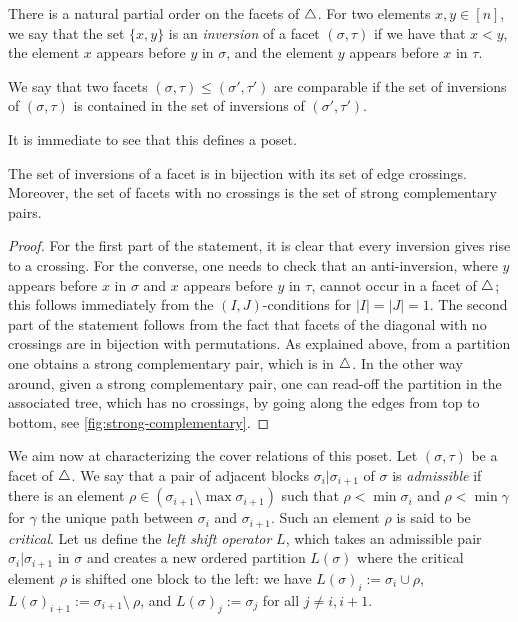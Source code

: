 There is a natural partial order on the facets of $\triangle$. 
For two elements $x,y \in [n]$, we say that the set $\{x,y\}$ is an \emph{inversion} of a facet $(\sigma,\tau)$ if we have that $x<y$, the element $x$ appears before $y$ in $\sigma$, and the element $y$ appears before $x$ in $\tau$. 

\begin{definition}
    We say that two facets $(\sigma,\tau) \leq (\sigma',\tau')$ are comparable if the set of inversions of $(\sigma,\tau)$ is contained in the set of inversions of $(\sigma',\tau')$.
\end{definition}

It is immediate to see that this defines a poset.

\begin{proposition}
\label{p:crossings}
The set of inversions of a facet is in bijection with its set of edge crossings. 
Moreover, the set of facets with no crossings is the set of strong complementary pairs. 
\end{proposition}

\begin{proof}
    For the first part of the statement, it is clear that every inversion gives rise to a crossing. 
    For the converse, one needs to check that an anti-inversion, where $y$ appears before $x$ in $\sigma$ and $x$ appears before $y$ in $\tau$, cannot occur in a facet of $\triangle$; this follows immediately from the $(I,J)$-conditions for $|I|=|J|=1$. 
    The second part of the statement follows from the fact that facets of the diagonal with no crossings are in bijection with permutations.
    As explained above, from a partition one obtains a strong complementary pair, which is in $\triangle$. 
    In the other way around, given a strong complementary pair, one can read-off the partition in the associated tree, which has no crossings, by going along the edges from top to bottom, see \cref{fig:strong-complementary}.
\end{proof}


We aim now at characterizing the cover relations of this poset. 
Let $(\sigma,\tau)$ be a facet of $\triangle$.
We say that a pair of adjacent blocks $\sigma_i | \sigma_{i+1}$ of $\sigma$ is \emph{admissible} if there is an element $\rho \in (\sigma_{i+1} \setminus \max\sigma_{i+1})$ such that $\rho < \min \sigma_{i}$ and $\rho < \min \gamma$ for $\gamma$ the unique path between $\sigma_i$ and $\sigma_{i+1}$. 
Such an element $\rho$ is said to be \emph{critical}. 
Let us define the \emph{left shift operator} $L$, which takes an admissible pair $\sigma_i | \sigma_{i+1}$ in $\sigma$ and creates a new ordered partition $L(\sigma)$ where the critical element $\rho$ is shifted one block to the left: we have $L(\sigma)_i := \sigma_i \cup \rho$, $L(\sigma)_{i+1} := \sigma_{i+1} \setminus \ \rho$, and $L(\sigma)_{j}:=\sigma_j$ for all $j\neq i, i+1$. 

